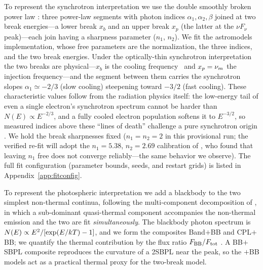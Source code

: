 To represent the synchrotron interpretation we use the double smoothly broken
power law \citep[2SBPL;][whose Equations~1--4 give the functional
form]{Ravasio2018}: three power-law segments with photon indices
$\alpha_1,\alpha_2,\beta$ joined at two break energies---a lower break $x_b$
and an upper break $x_p$ (the latter at the $\nu F_\nu$ peak)---each join
having a sharpness parameter ($n_1$, $n_2$). We fit the
\textsf{astromodels} implementation, whose free parameters are the
normalization, the three indices, and the two break energies. Under the
optically-thin synchrotron interpretation the two breaks are
physical---$x_b$ is the cooling frequency \nuc\ and $x_p=\nu_m$ the injection
frequency---and the segment between them carries the synchrotron slopes
$\alpha_1\simeq-2/3$ (slow cooling) steepening toward $-3/2$ (fast cooling).
These characteristic values follow from the radiation physics itself: the
low-energy tail of even a single electron's synchrotron spectrum cannot be
harder than $N(E)\propto E^{-2/3}$, and a fully cooled electron population
softens it to $E^{-3/2}$, so measured indices above these ``lines of death''
challenge a pure synchrotron origin
\citep[][]{Preece1998,Sari1998,Ravasio2019}. We hold the break sharpnesses fixed
($n_1=n_2=2$ in this provisional run; the verified re-fit will adopt the
$n_1=5.38$, $n_2=2.69$ calibration of \citealt{Ravasio2018}, who found that
leaving $n_1$ free does not converge reliably---the same behavior we observe).
The full fit configuration (parameter bounds, seeds, and restart grids) is
listed in Appendix~\ref{app:fitconfig}.

To represent the photospheric interpretation we add a blackbody to the two
simplest non-thermal continua, following the multi-component decomposition of
\citet{Guiriec2011,Guiriec2015}, in which a sub-dominant quasi-thermal component
accompanies the non-thermal emission and the two are fit \emph{simultaneously}.
The blackbody photon spectrum is $N(E)\propto E^{2}/[\exp(E/kT)-1]$, and we form
the composites Band$+$BB and CPL$+$BB; we quantify the thermal contribution by the
flux ratio $F_{\rm BB}/F_{\rm tot}$ \citep{Guiriec2015}. A BB$+$SBPL composite
reproduces the curvature of a 2SBPL near the peak, so the $+$BB models act as a
practical thermal proxy for the two-break model.

